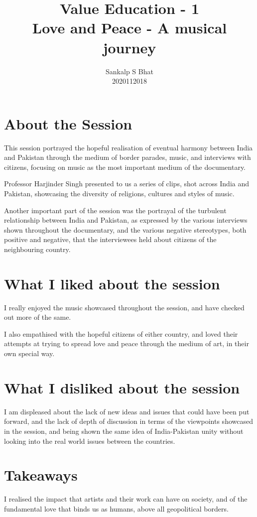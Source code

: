 \documentclass[a4paper]{article}
\title{Value Education - 1\\
Love and Peace - A musical journey
}
\author{Sankalp S Bhat\\
2020112018
}
\begin{document}
\maketitle
\thispagestyle{empty}

\section*{About the Session}

      This session portrayed the hopeful realisation of eventual harmony between India and Pakistan through the medium of border parades, music, and interviews with citizens, focusing on music as the most important medium of the documentary. 
      
      Professor Harjinder Singh presented to us a series of clips, shot across India and Pakistan, showcasing the diversity of religions, cultures and styles of music. 
      
      Another important part of the session was the portrayal of the turbulent relationship between India and Pakistan, as expressed by the various interviews shown throughout the documentary, and the various negative stereotypes, both positive and negative, that the interviewees held about citizens of the neighbouring country.

\section*{What I liked about the session}

    I really enjoyed the music showcased throughout the session, and have checked out more of the same.
    
    I also empathised with the hopeful citizens of either country, and loved their attempts at trying to spread love and peace through the medium of art, in their own special way.
     
 \section*{What I disliked about the session}
 
    I am displeased about the lack of new ideas and issues that could have been put forward, and the lack of depth of discussion in terms of the viewpoints showcased in the session, and being shown the same idea of India-Pakistan unity without looking into the real world issues between the countries.
 
 \section*{Takeaways}
    
    I realised the impact that artists and their work can have on society, and of the fundamental love that binds us as humans, above all geopolitical borders.
\end{document}
